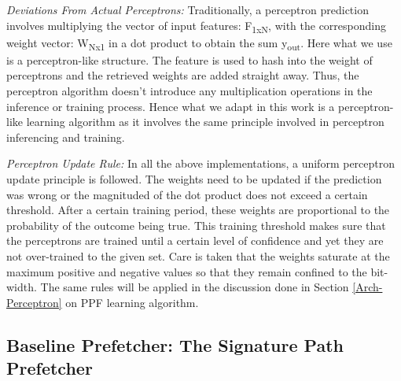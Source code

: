 
\textit{Deviations From Actual Perceptrons:} Traditionally, a perceptron
prediction involves multiplying the vector of input features:
F\textsubscript{1xN}, with the corresponding weight vector:
W\textsubscript{Nx1} in a dot product to obtain the sum y\textsubscript{out}.
Here what we use is a perceptron-like structure.  The feature is used to hash
into the weight of perceptrons and the retrieved weights are added straight
away.  Thus, the perceptron algorithm doesn't introduce any multiplication
operations in the inference or training process.  Hence what we adapt in this
work is a perceptron-like learning algorithm as it involves the same principle
involved in perceptron inferencing and training.

\textit{Perceptron Update Rule:} In all the above implementations, a uniform
perceptron update principle is followed.  The weights need to be updated if
the prediction was wrong or the magnituded of the dot product does not exceed
a certain threshold.  After a certain training period, these weights are
proportional to the probability of the outcome being true.  This training
threshold makes sure that the perceptrons are trained until a certain level of
confidence and yet they are not over-trained to the given set.  Care is taken
that the weights saturate at the maximum positive and negative values so that
they remain confined to the bit-width.  The same rules will be applied in the
discussion done in Section \ref{Arch-Perceptron} on PPF learning algorithm.



\subsection{Baseline Prefetcher: The Signature Path Prefetcher}
\label{Background-SPP}

